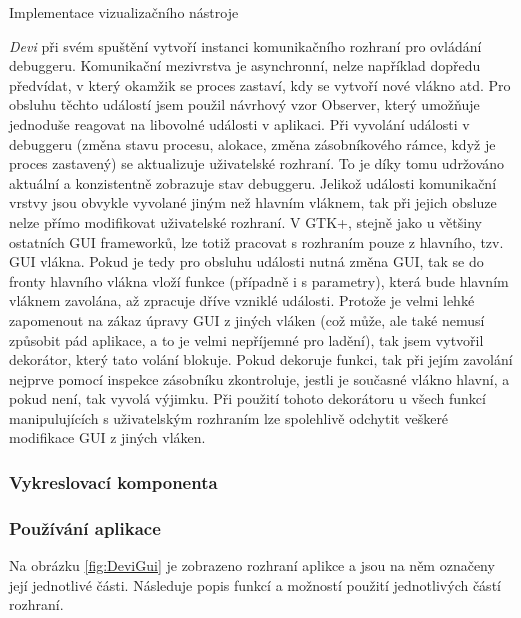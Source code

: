 \documentclass[bc,male,python,dept460]{diploma}						%
\newcommand{\parspace}[1][]{
	\ifthenelse{\isempty{#1}}{\vspace{5mm}}{\vspace{#1}}
	\par
}
\begin{document}
\begin{section}{Implementace vizualizačního nástroje}
	\parspace \textit{Devi} při svém spuštění vytvoří instanci komunikačního rozhraní pro ovládání debuggeru. Komunikační mezivrstva je asynchronní,
	nelze například dopředu předvídat, v který okamžik se proces zastaví, kdy se vytvoří nové vlákno atd. Pro obsluhu těchto událostí jsem použil návrhový vzor
	Observer\cite[326]{gof}, který umožňuje jednoduše reagovat na libovolné události v aplikaci. Při vyvolání události v debuggeru (změna stavu procesu,
	alokace, změna zásobníkového rámce, když je proces zastavený) se aktualizuje uživatelské rozhraní. To je díky tomu udržováno aktuální a konzistentně zobrazuje
	stav debuggeru. Jelikož události komunikační vrstvy jsou obvykle vyvolané jiným než hlavním vláknem, tak při jejich obsluze nelze přímo modifikovat uživatelské
	rozhraní. V GTK+, stejně jako u většiny ostatních GUI frameworků, lze totiž pracovat s rozhraním pouze z hlavního, tzv. GUI vlákna. Pokud je tedy pro
	obsluhu události nutná změna GUI, tak se do fronty hlavního vlákna vloží funkce (případně i s parametry), která bude hlavním vláknem zavolána,
	až zpracuje dříve vzniklé události. Protože je velmi lehké zapomenout na zákaz úpravy GUI z jiných vláken (což může, ale také nemusí způsobit pád
	aplikace, a to je velmi nepříjemné pro ladění), tak jsem vytvořil dekorátor, který tato volání blokuje. Pokud dekoruje funkci, tak při jejím zavolání
	nejprve pomocí inspekce zásobníku zkontroluje, jestli je současné vlákno hlavní, a pokud není, tak vyvolá výjimku. Při použití tohoto dekorátoru u všech
	funkcí manipulujících s uživatelským rozhraním lze spolehlivě odchytit veškeré modifikace GUI z jiných vláken.
	
	\subsubsection{Vykreslovací komponenta}
	
	\subsubsection{Používání aplikace}
	Na obrázku \ref{fig:DeviGui} je zobrazeno rozhraní aplikce a jsou na něm označeny její jednotlivé části. Následuje popis funkcí a možností použití
	jednotlivých částí rozhraní.
	
	

\end{section}
\end{document}
